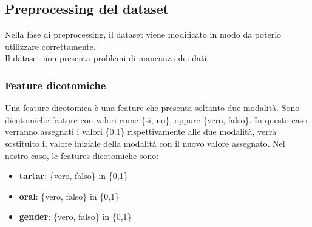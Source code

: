 \documentclass{article}
\begin{document}
\subsection{Preprocessing del dataset}
Nella fase di preprocessing, il dataset viene modificato in modo da poterlo utilizzare correttamente.\\
Il dataset non presenta problemi di mancanza dei dati.
\subsubsection{Feature dicotomiche}
Una feature dicotomica è una feature che presenta soltanto due modalità. 
Sono dicotomiche feature con valori come \{si, no\}, oppure \{vero, falso\}. In questo caso verranno assegnati i valori \{0,1\} rispettivamente alle due modalità, verrà sostituito
il valore iniziale della modalità con il nuovo valore assegnato. Nel nostro caso, le features dicotomiche sono:
\begin{itemize}
    \item \textbf{tartar}: \{vero, falso\} in \{0,1\}
    \item \textbf{oral}: \{vero, falso\} in \{0,1\}
    \item \textbf{gender}: \{vero, falso\} in \{0,1\}
\end{itemize}
\end{document}
